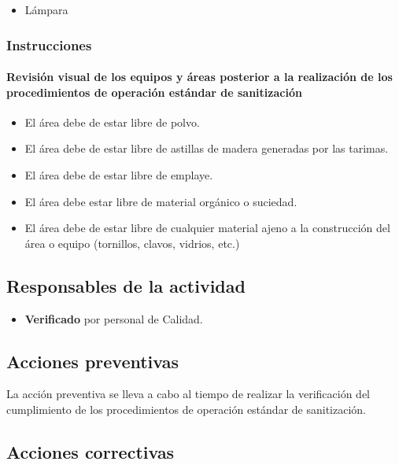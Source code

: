 \begin{itemize}
	\item Lámpara
\end{itemize}

\subsubsection{Instrucciones}

\paragraph{Revisión visual de los equipos y áreas posterior a la realización de los procedimientos de operación estándar de sanitización}

\begin{itemize}
	\item El área debe de estar libre de polvo.
	\item El área debe de estar libre de astillas de madera generadas por las tarimas.
	\item El área debe de estar libre de emplaye.
	\item El área debe estar libre de material orgánico o suciedad.
	\item El área debe de estar libre de cualquier material ajeno a la construcción del área o equipo (tornillos, clavos, vidrios, etc.)
\end{itemize}

\subsection{Responsables de la actividad}

\begin{itemize}
	\item \textbf{Verificado} por personal de Calidad.
\end{itemize}

\subsection{Acciones preventivas}

La acción preventiva se lleva a cabo al tiempo de realizar la verificación del cumplimiento de los procedimientos de operación estándar de sanitización.

\subsection{Acciones correctivas}

